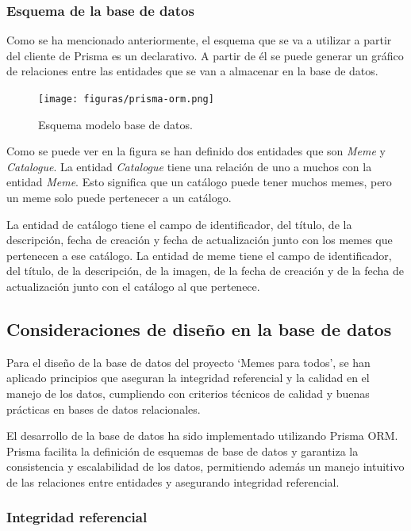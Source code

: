 \subsubsection{Esquema de la base de datos}

Como se ha mencionado anteriormente, el esquema que se va a utilizar a partir del cliente de Prisma es un declarativo. A partir de él se puede generar un gráfico de relaciones entre las entidades que se van a almacenar en la base de datos.

\begin{figure}[H]
    \caption{Esquema modelo base de datos.}
    \centering
    \vspace*{0.5cm}
    \texttt{[image: figuras/prisma-orm.png]}
\end{figure}

Como se puede ver en la figura se han definido dos entidades que son \textit{Meme} y \textit{Catalogue}. La entidad \textit{Catalogue} tiene una relación de uno a muchos con la entidad \textit{Meme}. Esto significa que un catálogo puede tener muchos memes, pero un meme solo puede pertenecer a un catálogo.

La entidad de catálogo tiene el campo de identificador, del título, de la descripción, fecha de creación y fecha de actualización junto con los memes que pertenecen a ese catálogo. La entidad de meme tiene el campo de identificador, del título, de la descripción, de la imagen, de la fecha de creación y de la fecha de actualización junto con el catálogo al que pertenece.

\subsection{Consideraciones de diseño en la base de datos}

Para el diseño de la base de datos del proyecto `Memes para todos', se han aplicado principios que aseguran la integridad referencial y la calidad en el manejo de los datos, cumpliendo con criterios técnicos de calidad y buenas prácticas en bases de datos relacionales.

El desarrollo de la base de datos ha sido implementado utilizando Prisma ORM. Prisma facilita la definición de esquemas de base de datos y garantiza la consistencia y escalabilidad de los datos, permitiendo además un manejo intuitivo de las relaciones entre entidades y asegurando integridad referencial.

\subsubsection{Integridad referencial}

